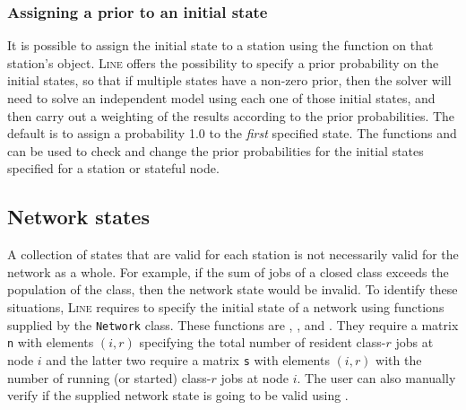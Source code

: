 \subsubsection{Assigning a prior to an initial state}
It is possible to assign the initial state to a station using the  function on that station's object. \textsc{Line} offers the possibility to specify a prior probability on the initial states, so that if multiple states have a non-zero prior, then the solver will need to solve an independent model using each one of those initial states, and then carry out a weighting of the results according to the prior probabilities. The default is to assign a probability 1.0 to the {\em first} specified state. The functions  and  can be used to check and change the prior probabilities for the initial states specified for a station or stateful node.

\subsection{Network states}
A collection of states that are valid for each station is not necessarily valid for the network as a whole. For example, if the sum of jobs of a closed class exceeds the population of the class, then the network state would be invalid. To identify these situations, \textsc{Line} requires to specify the initial state of a network using functions supplied by the \texttt{Network} class. These functions are , , and . They require a matrix \texttt{n} with elements $(i,r)$ specifying the total number of resident class-$r$ jobs at node $i$ and the latter two require a matrix \texttt{s} with elements $(i,r)$ with the number of running (or started) class-$r$ jobs at node $i$. The user can also manually verify if the supplied network state is going to be valid using .

